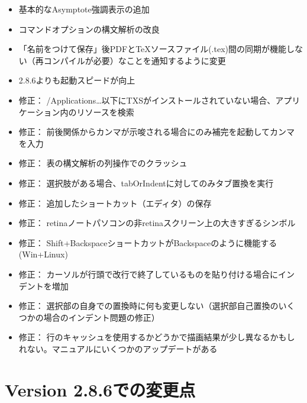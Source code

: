 \begin{itemize}
\item
  基本的なAsymptote強調表示の追加
\item
  コマンドオプションの構文解析の改良
\item
  「名前をつけて保存」後PDFとTeXソースファイル(.tex)間の同期が機能しない（再コンパイルが必要）なことを通知するように変更
\item
  2.8.6よりも起動スピードが向上
\item
  修正：
  /Applications\ldots{}以下にTXSがインストールされていない場合、アプリケーション内のリソースを検索
\item
  修正：
  前後関係からカンマが示唆される場合にのみ補完を起動してカンマを入力
\item
  修正： 表の構文解析の列操作でのクラッシュ
\item
  修正： 選択肢がある場合、tabOrIndentに対してのみタブ置換を実行
\item
  修正： 追加したショートカット（エディタ）の保存
\item
  修正： retinaノートパソコンの非retinaスクリーン上の大きすぎるシンボル
\item
  修正：
  Shift+BackspaceショートカットがBackspaceのように機能する(Win+Linux)
\item
  修正：
  カーソルが行頭で改行で終了しているものを貼り付ける場合にインデントを増加
\item
  修正：
  選択部の自身での置換時に何も変更しない（選択部自己置換のいくつかの場合のインデント問題の修正）
\item
  修正：
  行のキャッシュを使用するかどうかで描画結果が少し異なるかもしれない。マニュアルにいくつかのアップデートがある
\end{itemize}

\section{Version 2.8.6での変更点}

